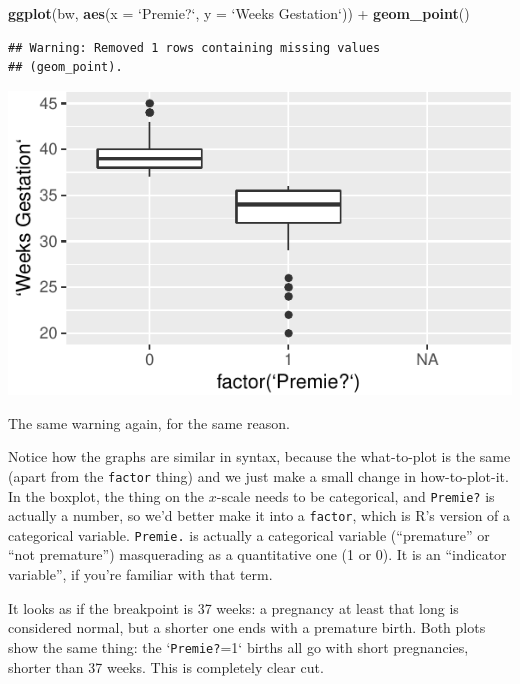 \documentclass[]{tufte-book}
\newenvironment{Shaded}{}{}
\newcommand{\DataTypeTok}[1]{\textcolor[rgb]{0.56,0.13,0.00}{#1}}
\newcommand{\KeywordTok}[1]{\textcolor[rgb]{0.00,0.44,0.13}{\textbf{#1}}}
\newcommand{\NormalTok}[1]{#1}
\newcommand{\OperatorTok}[1]{\textcolor[rgb]{0.40,0.40,0.40}{#1}}
\newcommand{\StringTok}[1]{\textcolor[rgb]{0.25,0.44,0.63}{#1}}
\theoremstyle{definition}
\theoremstyle{definition}
\theoremstyle{definition}
\theoremstyle{remark}
\begin{document}
\begin{Shaded}
\begin{Highlighting}[]
\KeywordTok{ggplot}\NormalTok{(bw, }\KeywordTok{aes}\NormalTok{(}\DataTypeTok{x =} \StringTok{`}\DataTypeTok{Premie?}\StringTok{`}\NormalTok{, }\DataTypeTok{y =} \StringTok{`}\DataTypeTok{Weeks Gestation}\StringTok{`}\NormalTok{)) }\OperatorTok{+}\StringTok{ }
\StringTok{    }\KeywordTok{geom_point}\NormalTok{()}
\end{Highlighting}
\end{Shaded}

\begin{verbatim}
## Warning: Removed 1 rows containing missing values
## (geom_point).
\end{verbatim}

\includegraphics{03-data-summaries_files/figure-latex/unnamed-chunk-18-1}

The same warning again, for the same reason.

Notice how the graphs are similar in syntax, because the what-to-plot is
the same (apart from the \texttt{factor} thing) and we just make a small
change in how-to-plot-it. In the boxplot, the thing on the \(x\)-scale
needs to be categorical, and \texttt{Premie?} is actually a number, so
we'd better make it into a \texttt{factor}, which is R's version of a
categorical variable. \texttt{Premie.} is actually a categorical
variable (``premature'' or ``not premature'') masquerading as a
quantitative one (1 or 0). It is an ``indicator variable'', if you're
familiar with that term.

It looks as if the breakpoint is 37 weeks: a pregnancy at least that
long is considered normal, but a shorter one ends with a premature
birth. Both plots show the same thing: the `\texttt{Premie?}=1` births
all go with short pregnancies, shorter than 37 weeks. This is completely
clear cut.
\end{document}
